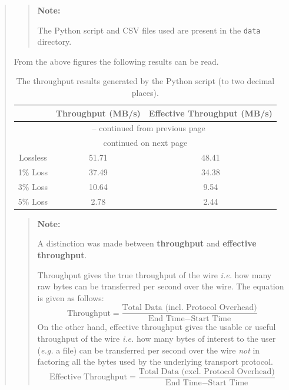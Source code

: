 \documentclass{article}
\newenvironment{ans}
{\fbox{Answer}\begin{quote}\nopagebreak}
{\end{quote}}
\newcommand\ie{\emph{i.e.}}
\newcommand\eg{\emph{e.g.}}
\newenvironment{note}{%
\begin{quote}
\begin{tcolorbox}[colback=gray!10,arc=0mm,boxrule=0pt]
\raggedright
\textbf{Note:}%
}{%
\end{tcolorbox}
\end{quote}%
}
\begin{document}
\begin{ans}
\begin{note}
The Python script and CSV files used are present in the \texttt{data} directory.
\end{note}

From the above figures the following results can be read.

\begin{center}
\begin{longtable}{c|cc}
\caption{The throughput results generated by the Python script (to two decimal places).}
\label{longtable:results-q9}                                                                            \\
\multicolumn{1}{c|}{}                 &
\multicolumn{1}{c}{Throughput (MB/s)} &
\multicolumn{1}{c}{Effective Throughput (MB/s)}\\
\hline
\endfirsthead

\multicolumn{3}{c}{\tablename\ \thetable{} -- continued from previous page}                                     \\
\hline
\endhead

\hline
\multicolumn{3}{|c|}{{continued on next page}}                                                                  \\
\hline
\endfoot

\endlastfoot

Lossless & 51.71 & 48.41 \\ 1\% Loss & 37.49 & 34.38 \\ 3\%
Loss & 10.64 & 9.54 \\ 5\% Loss & 2.78 & 2.44
\end{longtable}
\end{center}

\begin{note}
A distinction was made between \textbf{throughput} and \textbf{effective
throughput}.

Throughput gives the true throughput of the wire \ie{} how
many raw bytes can be transferred per second over the wire.
The equation is given as follows: $$ \text{Throughput} =
\frac{\text{Total Data (incl. Protocol
Overhead)}}{\text{End Time} - \text{Start Time}} $$ On the
other hand, effective throughput gives the usable or useful
throughput of the wire \ie{} how many bytes of interest to
the user (\eg{} a file) can be transferred per second over
the wire \textit{not} in factoring all the bytes used by
the underlying transport protocol. $$ \text{Effective
Throughput} = \frac{\text{Total Data (excl. Protocol
Overhead)}}{\text{End Time} - \text{Start Time}} $$
\end{note}
\end{ans}
\end{document}
